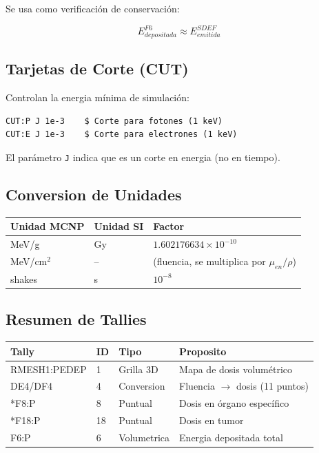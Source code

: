 \documentclass[12pt,a4paper]{article}
\begin{document}
Se usa como verificación de conservación:

$$
E_{depositada}^{F6} \approx E_{emitida}^{SDEF}
$$

\subsection{Tarjetas de Corte (CUT)}

Controlan la energia mínima de simulación:

\begin{lstlisting}
CUT:P J 1e-3    $ Corte para fotones (1 keV)
CUT:E J 1e-3    $ Corte para electrones (1 keV)
\end{lstlisting}

El parámetro \texttt{J} indica que es un corte en energia (no en tiempo).

\subsection{Conversion de Unidades}

\begin{center}
\begin{tabular}{lll}
\toprule
\textbf{Unidad MCNP} & \textbf{Unidad SI} & \textbf{Factor} \\
\midrule
MeV/g & Gy & $1.602176634 \times 10^{-10}$ \\
MeV/cm$^2$ & -- & (fluencia, se multiplica por $\mu_{en}/\rho$) \\
shakes & s & $10^{-8}$ \\
\bottomrule
\end{tabular}
\end{center}

\subsection{Resumen de Tallies}

\begin{center}
\begin{tabular}{llll}
\toprule
\textbf{Tally} & \textbf{ID} & \textbf{Tipo} & \textbf{Proposito} \\
\midrule
RMESH1:PEDEP & 1 & Grilla 3D & Mapa de dosis volumétrico \\
DE4/DF4 & 4 & Conversion & Fluencia $\to$ dosis (11 puntos) \\
*F8:P & 8 & Puntual & Dosis en órgano específico \\
*F18:P & 18 & Puntual & Dosis en tumor \\
F6:P & 6 & Volumetrica & Energia depositada total \\
\bottomrule
\end{tabular}
\end{center}
\end{document}
